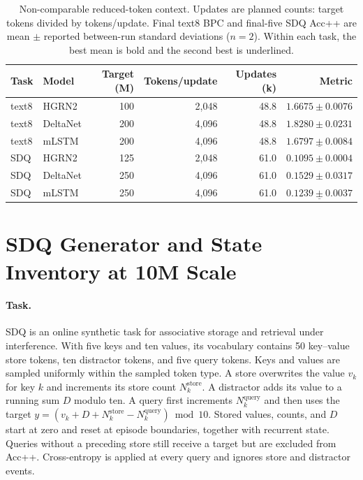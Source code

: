 \documentclass[letterpaper,twoside]{article}
\begin{document}
\begin{table}[h]
\centering
\caption{Non-comparable reduced-token context. Updates are planned counts: target tokens divided by tokens/update. Final text8 BPC and final-five SDQ Acc++ are mean $\pm$ reported between-run standard deviations ($n=2$). Within each task, the best mean is bold and the second best is underlined.}
\label{tab:reduced}
\begin{tabular}{llrrrr}
\toprule
Task & Model & Target (M) & Tokens/update & Updates (k) & Metric \\
\midrule
text8 & HGRN2 & 100 & 2,048 & 48.8 & $\mathbf{1.6675\pm0.0076}$ \\
text8 & DeltaNet & 200 & 4,096 & 48.8 & $1.8280\pm0.0231$ \\
text8 & mLSTM & 200 & 4,096 & 48.8 & $\underline{1.6797\pm0.0084}$ \\
\midrule
SDQ & HGRN2 & 125 & 2,048 & 61.0 & $0.1095\pm0.0004$ \\
SDQ & DeltaNet & 250 & 4,096 & 61.0 & $\mathbf{0.1529\pm0.0317}$ \\
SDQ & mLSTM & 250 & 4,096 & 61.0 & $\underline{0.1239\pm0.0037}$ \\
\bottomrule
\end{tabular}
\end{table}

\section{SDQ Generator and State Inventory at 10M Scale}\label{app:sdq}

\paragraph{Task.}
SDQ is an online synthetic task for associative storage and retrieval under interference. With five keys and ten values, its vocabulary contains 50 key--value store tokens, ten distractor tokens, and five query tokens. Keys and values are sampled uniformly within the sampled token type. A store overwrites the value $v_k$ for key $k$ and increments its store count $N_k^{\mathrm{store}}$. A distractor adds its value to a running sum $D$ modulo ten. A query first increments $N_k^{\mathrm{query}}$ and then uses the target $y=(v_k+D+N_k^{\mathrm{store}}-N_k^{\mathrm{query}})\bmod 10$. Stored values, counts, and $D$ start at zero and reset at episode boundaries, together with recurrent state. Queries without a preceding store still receive a target but are excluded from Acc++. Cross-entropy is applied at every query and ignores store and distractor events.
\end{document}
